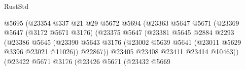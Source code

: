 \begin{lexlean}{RustStd}
\begin{coremodule}
                                                @5695
                                                (@23354
                                                  @337
                                                  @21
                                                  @29
                                                  @5672
                                                  @5694
                                                  (@23363
                                                    @5647
                                                    @5671
                                                    (@23369
                                                      @5647
                                                      (@3172 @5671 @3176)
                                                      (@23375
                                                        @5647
                                                        (@23381
                                                          @5645
                                                          @2884
                                                          @2293
                                                          (@23386
                                                            @5645
                                                            (@23390
                                                              @5643
                                                              @3176
                                                              (@23002
                                                                @5639
                                                                @5641
                                                                (@23011 @5629 @3396 @23021 @11026))
                                                              @22867))
                                                          @23405
                                                          @23408
                                                          @23411
                                                          @23414
                                                          @10463))
                                                      (@23422
                                                        @5671
                                                        @3176
                                                        (@23426
                                                          @5671
                                                          (@23432
                                                            @5669

\end{coremodule}
\end{lexlean}

